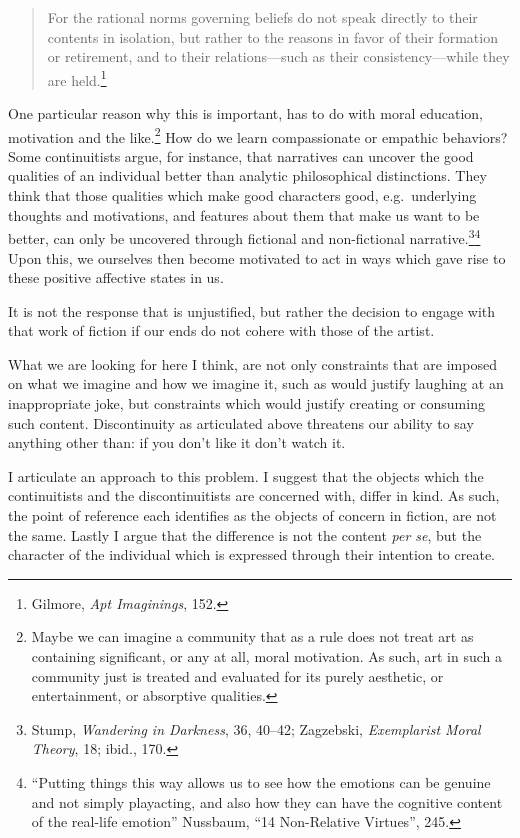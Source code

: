 \documentclass[phdthesis,12pt,final]{wuthesis}
\theoremstyle{definition}
\theoremstyle{definition}
\theoremstyle{definition}
\theoremstyle{definition}
\theoremstyle{remark}
\begin{document}
\begin{quote}
For the rational norms governing beliefs do not speak directly to their contents in isolation, but rather to the reasons in favor of their formation or retirement, and to their relations---such as their consistency---while they are held.\footnote{Gilmore, \emph{Apt {Imaginings}}, 152.}
\end{quote}

One particular reason why this is important, has to do with moral education, motivation and the like.\footnote{Maybe we can imagine a community that as a rule does not treat art as containing significant, or any at all, moral motivation. As such, art in such a community just is treated and evaluated for its purely aesthetic, or entertainment, or absorptive qualities.} How do we learn compassionate or empathic behaviors? Some continuitists argue, for instance, that narratives can uncover the good qualities of an individual better than analytic philosophical distinctions. They think that those qualities which make good characters good, e.g.~underlying thoughts and motivations, and features about them that make us want to be better, can only be uncovered through fictional and non-fictional narrative.\footnote{Stump, \emph{Wandering in {Darkness}}, 36, 40--42; Zagzebski, \emph{Exemplarist {Moral Theory}}, 18; ibid., 170.}\footnote{``Putting things this way allows us to see how the emotions can be genuine and not simply playacting, and also how they can have the cognitive content of the real-life emotion'' Nussbaum, {``14 {Non-Relative Virtues}''}, 245.} Upon this, we ourselves then become motivated to act in ways which gave rise to these positive affective states in us.

It is not the response that is unjustified, but rather the decision to engage with that work of fiction if our ends do not cohere with those of the artist.

What we are looking for here I think, are not only constraints that are imposed on what we imagine and how we imagine it, such as would justify laughing at an inappropriate joke, but constraints which would justify creating or consuming such content. Discontinuity as articulated above threatens our ability to say anything other than: if you don't like it don't watch it.

I articulate an approach to this problem. I suggest that the objects which the continuitists and the discontinuitists are concerned with, differ in kind. As such, the point of reference each identifies as the objects of concern in fiction, are not the same. Lastly I argue that the difference is not the content \emph{per se}, but the character of the individual which is expressed through their intention to create.
\end{document}
